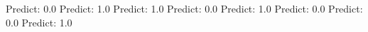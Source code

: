 \documentclass[12pt]{article}
\begin{document}
\begin{algorithmic}
                    \State Predict: 0.0
                \Else
                    \State Predict: 1.0
                \EndIf
            \Else
                    \State Predict: 1.0
                \Else
                    \State Predict: 0.0
                \EndIf
            \EndIf
        \Else
                    \State Predict: 1.0
                \Else
                    \State Predict: 0.0
                \EndIf
            \Else
                    \State Predict: 0.0
                \Else
                    \State Predict: 1.0
                \EndIf
            \EndIf
        \EndIf
    \EndIf
\EndIf

\end{algorithmic}
\end{document}
